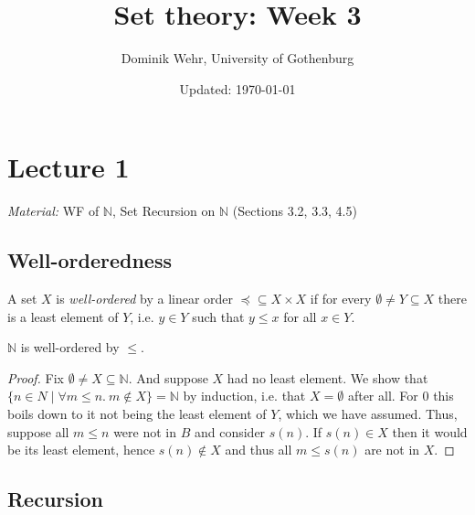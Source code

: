 \documentclass{whrartcl}
\title{Set theory: Week 3}
\author{Dominik Wehr, University of Gothenburg}
\date{Updated: \today}
\newcommand{\NN}{\mathbb{N}}
\begin{document}
\maketitle

\section{Lecture 1}

\emph{Material:} WF of $\NN$, Set Recursion on $\NN$ (Sections 3.2, 3.3, 4.5)

\subsection{Well-orderedness}

\begin{definition}
  A set $X$ is \emph{well-ordered} by a linear order $\preceq \subseteq X \times
  X$ if for every $\emptyset \neq Y \subseteq X$ there is a least element of
  $Y$, i.e. $y \in Y$ such that $y \leq x$ for all $x \in Y$.
\end{definition}

\begin{proposition}
  $\NN$ is well-ordered by $\leq$.
\end{proposition}
\begin{proof}
  Fix $\emptyset \neq X \subseteq \NN$. And suppose $X$ had no least element. We
  show that $\{n \in N \mid \forall m \leq n.~m \not\in X\} = \NN$ by induction,
  i.e. that $X = \emptyset$ after all. For $0$ this boils down to it not being
  the least element of $Y$, which we have assumed. Thus, suppose all $m \leq n$
  were not in $B$ and consider $s(n)$. If $s(n) \in X$ then it would be its
  least element, hence $s(n) \not\in X$ and thus all $m \leq s(n)$ are not in
  $X$.
\end{proof}

\subsection{Recursion}
\end{document}
